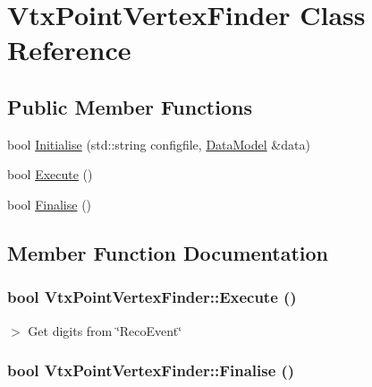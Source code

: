 \hypertarget{classVtxPointVertexFinder}{
\section{VtxPointVertexFinder Class Reference}
\label{classVtxPointVertexFinder}
}
\subsection*{Public Member Functions}
\begin{DoxyCompactItemize}
\item 
bool \hyperlink{classVtxPointVertexFinder_a5f022abdc58cbce7e071e596bcb1d75d}{Initialise} (std::string configfile, \hyperlink{classDataModel}{DataModel} \&data)
\item 
bool \hyperlink{classVtxPointVertexFinder_ad834ee2a0ce8fb24c3a7ebdbac796072}{Execute} ()
\item 
bool \hyperlink{classVtxPointVertexFinder_aa8161e8fd414eab8bf17766cb353aa91}{Finalise} ()
\end{DoxyCompactItemize}


\subsection{Member Function Documentation}
\hypertarget{classVtxPointVertexFinder_ad834ee2a0ce8fb24c3a7ebdbac796072}{
\subsubsection[{Execute}]{\setlength{\rightskip}{0pt plus 5cm}bool VtxPointVertexFinder::Execute ()}}
\label{classVtxPointVertexFinder_ad834ee2a0ce8fb24c3a7ebdbac796072}


$>$ Get digits from \char`\"{}RecoEvent\char`\"{} \hypertarget{classVtxPointVertexFinder_aa8161e8fd414eab8bf17766cb353aa91}{
\subsubsection[{Finalise}]{\setlength{\rightskip}{0pt plus 5cm}bool VtxPointVertexFinder::Finalise ()}}
\label{classVtxPointVertexFinder_aa8161e8fd414eab8bf17766cb353aa91}


